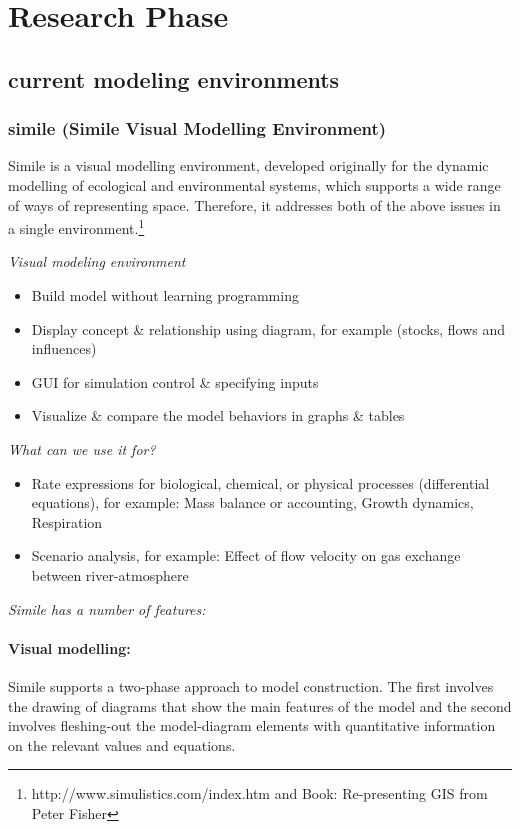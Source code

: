 \chapter{Research Phase}
\section{current modeling environments}

\subsection{simile (Simile Visual Modelling Environment)}
Simile is a visual modelling environment, developed originally for the dynamic modelling of ecological and environmental systems, which supports a wide range of ways of representing space. Therefore, it addresses both of the above issues in a single environment.\footnote{http://www.simulistics.com/index.htm and Book: Re-presenting GIS from Peter Fisher}

\emph{Visual modeling environment}
\begin{itemize}
	\item Build model without learning programming
	\item Display concept \& relationship using diagram, for example (stocks, flows and influences)
	\item GUI for simulation control \& specifying inputs
	\item Visualize \& compare the model behaviors in  graphs \& tables
\end{itemize}

\emph{What can we use it for?}
\begin{itemize}
	\item Rate expressions for biological, chemical, or physical processes (differential equations), for example: Mass balance or accounting, Growth dynamics, Respiration
	\item Scenario analysis, for example: Effect of flow velocity on gas exchange between  river-atmosphere
\end{itemize}

\emph{Simile has a number of features:}
	\subsubsection{Visual modelling:}
Simile supports a two-phase approach to model construction. The first involves the drawing of diagrams that show the main features of the model and the second involves fleshing-out the model-diagram elements with quantitative information on the relevant values and equations.
